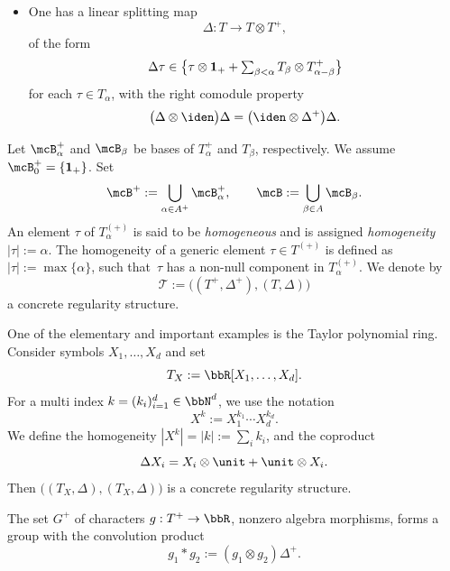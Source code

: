 \begin{defn*}
\begin{itemize}
\item One has a linear splitting map\vspace*{-3pt}
\[
\Delta : T \to T\otimes T^+,
\]
of the form\vspace*{-3pt}
\begin{equation}
\label{EqDelta}
\Delta \tau \in \bigl\{\tau\otimes {\bf 1}_+ + \textstyle\sum_{\beta<\alpha} T_\beta\otimes T^+_{\alpha-\beta}\bigr\}
\end{equation}
for each $\tau\in T_\alpha$, with the right comodule property\vspace*{-3pt}
\begin{equation*}
\bigl(\Delta\otimes \iden\bigr)\Delta = \bigl(\iden\otimes \Delta^+\bigr)\Delta.
\end{equation*}
\end{itemize}
Let $\mcB_\alpha^+$ and $\mcB_\beta$ be bases of $T_\alpha^+$ and $T_\beta$, respectively. We assume $\mcB_0^+=\{{\bf1}_+\}$. Set\vspace*{-1pt}
\[
\mcB^+ := \bigcup_{\alpha\in A^+} \mcB_\alpha^+, \qquad \mcB := \bigcup_{\beta\in A} \mcB_\beta.
\]
An element $\tau$ of $T_\alpha^{(+)}$ is said to be \emph{homogeneous} and is assigned \emph{{homogeneity}} $|\tau| := \alpha$. The homogeneity of a generic element $\tau\in T^{(+)}$ is defined as $|\tau| := \max\{\alpha\}$, such that~$\tau$ has a non-null component in $T^{(+)}_\alpha$.
We denote by\vspace*{-3pt}
\[
\mathscr{T} := \bigl((T^+,\Delta^+), (T,\Delta)\bigr)
\]
a concrete regularity structure.
\end{defn*}

One of the elementary and important examples is the Taylor polynomial ring. Consider symbols $X_1, \dots, X_d$ and set\vspace*{-3pt}
\[
T_X := \bbR[X_1,\dots, X_d].
\]
For a multi index $k=(k_i)_{i=1}^d\in\bbN^d$, we use the notation\vspace*{-3pt}
\[
X^k := X_1^{k_1}\cdots X_d^{k_d}.
\]
We define the homogeneity $|X^k|=|k|:=\sum_ik_i$, and the coproduct\vspace*{-1pt}
\begin{equation} \label{EqCoproductPolynomials}
\Delta X_i=X_i\otimes\unit+\unit\otimes X_i.
\end{equation}
Then $\bigl((T_X,\Delta),(T_X,\Delta)\bigr)$ is a concrete regularity structure.

The set $G^+$ of characters $g : T^+\to\bbR$, \ie nonzero algebra morphisms, forms a group with the convolution product\vspace*{-3pt}
\[
g_1*g_2:=(g_1\otimes g_2)\Delta^+.
\]

